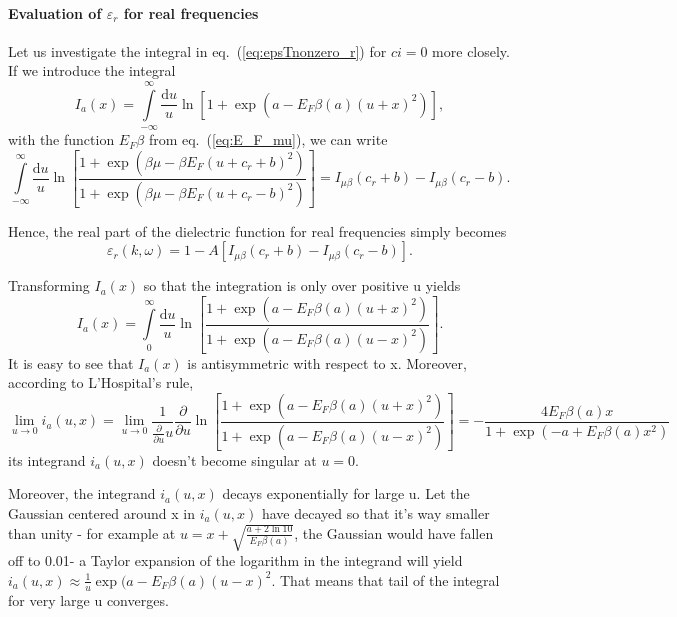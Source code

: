 \documentclass[physics,phd,nolot,nolof]{uccthesis}%
\begin{document}
{\paragraph*{Evaluation of $\varepsilon_r$ for real frequencies}
Let us investigate the integral in eq.~(\ref{eq:epsTnonzero_r}) for $ci=0$ more closely.
If we introduce the integral 
\begin{equation}
  I_a(x)=\int\limits_{-\infty}^\infty \frac{\mathrm{d} u}{u} 
  \ln\left[1+\exp\left(a- E_F\beta(a)(u+x)^2 \right)\right],
  \label{eq:Int_mu_x}
\end{equation}
with the function $E_F\beta$ from eq.~(\ref{eq:E_F_mu}),
we can write
\begin{equation}
  \int\limits_{-\infty}^\infty\frac{\mathrm{d} u}{u} 
   \ln
   \left[
   \frac{  1+\exp\left(\beta\mu- \beta E_F(u+c_r+b)^2 \right) }
   { 1+\exp\left(\beta\mu- \beta E_F(u+c_r-b)^2 \right) } 
   \right]=I_{\mu\beta}(c_r+b) -I_{\mu\beta}(c_r -b).
  \label{eq:epsTnonzero_realfrequency}
\end{equation}

Hence, the real part of the dielectric function for real frequencies simply becomes 
\begin{equation}
  \varepsilon_r(k,\omega)	=
  		1-A \left[ 
		I_{\mu\beta}(c_r+b)-I_{\mu\beta}(c_r-b)
		\right].
\label{eq:reepsWingerPoisson_realw}
\end{equation}

Transforming $I_a(x)$ so that the integration is only over positive u yields
\begin{equation}
  I_a(x)=\int\limits_{0}^\infty \frac{\mathrm{d} u}{u} 
  \ln\left[
  \frac
  { 1+\exp\left(a- E_F\beta(a)(u+x)^2 \right)}
  { 1+\exp\left(a- E_F\beta(a)(u-x)^2 \right)}
  \right].
  \label{eq:Int_mu_x}
\end{equation}
It is easy to see that $I_a(x)$ is antisymmetric with respect to x.
Moreover, according to L'Hospital's rule,
\[
\lim_{u \to 0}  i_a(u,x)=\lim_{u \to 0} \frac{1}{\frac{\partial}{\partial u} u}\frac{\partial}{\partial u}  \ln\left[
  \frac
  { 1+\exp\left(a- E_F\beta(a)(u+x)^2 \right)}
  { 1+\exp\left(a- E_F\beta(a)(u-x)^2 \right)}
  \right]
  =-\frac{4E_F\beta(a)x}{ 1+\exp\left(-a +E_F\beta(a)x^2 \right)}
\]
its integrand  $i_a(u,x)$ doesn't become singular at $u=0$.

Moreover, the integrand $i_a(u,x)$ decays exponentially for large u. 
Let the Gaussian centered around x in $i_a(u,x)$ have decayed so that it's way smaller than unity - for example at $u=x+\sqrt{\frac{a+2\ln10}{E_F\beta(a)}}$, the Gaussian would have fallen off to 0.01-
a Taylor expansion of the logarithm in the integrand will yield
$i_a(u,x)\approx \frac{1}{u}\exp(a-E_F\beta(a)(u-x)^2$.
That means that tail of the integral for very large u converges.

}
\end{document}
